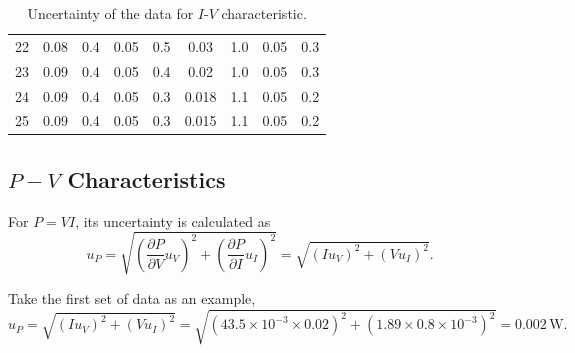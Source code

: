 \documentclass[a4paper]{article}
\begin{document}
\begin{table}[H]
\begin{tabular}{c|cc||cc||cc||cc}
		22 & 0.08                         & 0.4                            & 0.05                         & 0.5                        & 0.03      & 1.0        & 0.05      & 0.3        \\
		23 & 0.09                         & 0.4                            & 0.05                         & 0.4                        & 0.02      & 1.0        & 0.05      & 0.3        \\
		24 & 0.09                         & 0.4                            & 0.05                         & 0.3                        & 0.018     & 1.1        & 0.05      & 0.2        \\
		25 & 0.09                         & 0.4                            & 0.05                         & 0.3                        & 0.015     & 1.1        & 0.05      & 0.2        \\
		\hline
	\end{tabular}
	\caption{Uncertainty of the data for $I$-$V$ characteristic.}
	\label{table::unI-V}
\end{table}

\subsection{$P-V$ Characteristics}

For $P = VI$, its uncertainty is calculated as
$$u_P = \sqrt{(\frac{\partial P}{\partial V}u_V)^2 + (\frac{\partial P}{\partial I}u_I)^2} = \sqrt{(Iu_V)^2 + (Vu_I)^2}.$$

Take the first set of data as an example,
$$u_P = \sqrt{(Iu_V)^2 + (Vu_I)^2} = \sqrt{(43.5\times 10^{-3}\times 0.02)^2 + (1.89\times 0.8\times 10^{-3})^2} = 0.002\,\text{W}.$$
\end{document}
